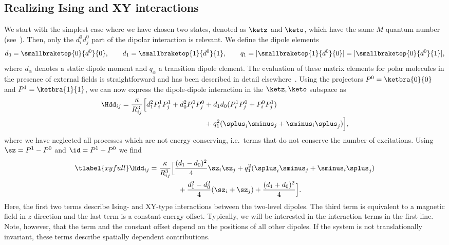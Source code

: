 \subsection{Realizing Ising and XY interactions}
We start with the simplest case where we have chosen two states, denoted as $\ketz$ and $\keto$, which have the same $M$ quantum number (see~).
Then, only the $d^0_id^0_j$ part of the dipolar interaction is relevant.
We define the dipole elements
\begin{align}
    d_0 = \smallbraketop{0}{d^0}{0},\qquad
    d_1 = \smallbraketop{1}{d^0}{1},\qquad
    q_1 = |\smallbraketop{1}{d^0}{0}| = |\smallbraketop{0}{d^0}{1}|,
\end{align}
where $d_\alpha$ denotes a static dipole moment and $q_\alpha$ a transition dipole element.
The evaluation of these matrix elements for polar molecules in the presence of external fields is straightforward and has been described in detail elsewhere~\cite{Micheli2007}.
Using the projectors $P^0 = \ketbra{0}{0}$ and $P^1 = \ketbra{1}{1}$, we can now express the
dipole-dipole interaction  in the $\ketz, \keto$ subspace as
\begin{align}
    \Hdd_{ij} = \frac{\kappa}{R_{ij}^3} \Big[ d_1^2 P^1_i P^1_j + d_0^2 P^0_i P^0_j &+ d_1d_0 (P^1_i P^0_j + P^0_i P^1_j) \\
              &+ q_1^2 (\splus_i \sminus_j + \sminus_i \splus_j) \Big],
\end{align}
where we have neglected all processes which are not energy-conserving,
i.e.~terms that do not conserve the number of excitations.
Using $\sz = P^1 - P^0$ and $\id = P^1 + P^0$ we find
\begin{align} \tlabel{xyfull}
    \Hdd_{ij} &= \frac{\kappa}{R_{ij}^3} \Big[ \frac{(d_1-d_0)^2}{4} \sz_i \sz_j  + q_1^2 (\splus_i \sminus_j + \sminus_i \splus_j)\\
              &\qquad\qquad + \frac{d_1^2 - d_0^2}{4} (\sz_i + \sz_j)  + \frac{(d_1+d_0)^2}{4} \Big].
\end{align}
Here, the first two terms describe Ising- and XY-type interactions between the two-level dipoles. The third term is equivalent to a magnetic field in $z$ direction and the last term is a constant energy offset. Typically, we will be interested in the interaction terms in the first line. Note, however, that the  term and the constant offset depend on the positions of all other dipoles. If the system is not translationally invariant, these terms
describe spatially dependent contributions.

